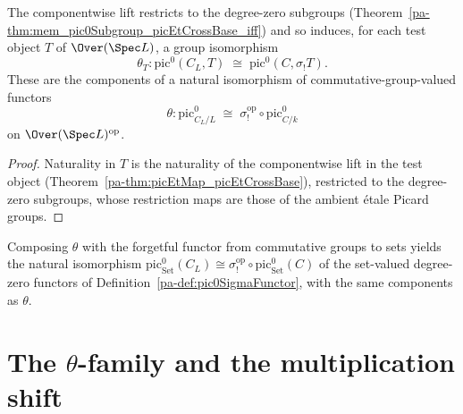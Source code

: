 \begin{definition}
  \label{pa-def:pic0Theta}
  \leanok

  The componentwise lift restricts to the degree-zero subgroups
  (Theorem~\ref{pa-thm:mem_pic0Subgroup_picEtCrossBase_iff}) and so induces, for each
  test object \(T\) of \(\Over(\Spec L)\), a group isomorphism
  \[
    \theta_T \colon \mathrm{pic}^0(C_L, T) \;\cong\; \mathrm{pic}^0(C, \sigma_{!}T).
  \]
  These are the components of a natural isomorphism of commutative-group-valued
  functors
  \[
    \theta \colon \mathrm{pic}^0_{C_L/L}
      \;\cong\; \sigma_{!}^{\mathrm{op}} \circ \mathrm{pic}^0_{C/k}
  \]
  on \(\Over(\Spec L)^{\mathrm{op}}\).
\end{definition}
\begin{proof}
  \leanok
  Naturality in \(T\) is the naturality of the componentwise lift in the test object
  (Theorem~\ref{pa-thm:picEtMap_picEtCrossBase}), restricted to the degree-zero
  subgroups, whose restriction maps are those of the ambient \'etale Picard groups.
\end{proof}

\begin{definition}
  \label{pa-def:pic0ThetaType}
  \leanok

  Composing \(\theta\) with the forgetful functor from commutative groups to sets
  yields the natural isomorphism
  \(\mathrm{pic}^0_{\mathrm{Set}}(C_L) \cong
    \sigma_{!}^{\mathrm{op}} \circ \mathrm{pic}^0_{\mathrm{Set}}(C)\)
  of the set-valued degree-zero functors of
  Definition~\ref{pa-def:pic0SigmaFunctor}, with the same components as \(\theta\).
\end{definition}

\section{The \texorpdfstring{\(\theta\)}{theta}-family and the multiplication shift}
\label{pa-sec:thetaShift}

